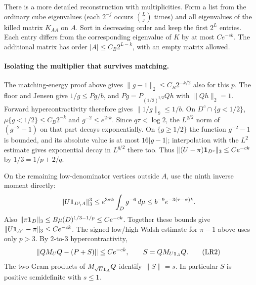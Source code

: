 There is a more detailed reconstruction with multiplicities. Form a list
from the ordinary cube eigenvalues (each $2^{-j}$ occurs $\binom Lj$ times)
and all eigenvalues of the killed matrix $K_{AA}$ on $A$. Sort in decreasing
order and keep the first $2^L$ entries. Each entry differs from the
corresponding eigenvalue of $K$ by at most $Ce^{-ck}$. The additional
matrix has order $|A|\le C_B2^{L-k}$, with an empty matrix allowed.

\paragraph{Isolating the multiplier that survives matching.}
The matching-energy proof above gives $\|g-1\|_2\le C_B2^{-k/2}$
also for this $p$. The floor and Jensen give $1/g\le Pg/b$, and
$Pg=P_{(1/2)^{3/2}}Qh$ with $\|Qh\|_2=1$. Forward hypercontractivity
therefore gives $\|1/g\|_9\le1/b$.
On $D^c\cap\{g<1/2\}$, $\mu\{g<1/2\}\le C_B2^{-k}$ and
$g^{-2}\le e^{2\tau k}$. Since $q\tau<\log 2$,
the $L^{q/2}$ norm of $(g^{-2}-1)$ on that part decays exponentially.
On $\{g\ge1/2\}$ the function $g^{-2}-1$ is bounded, and its absolute
value is at most $16|g-1|$; interpolation with the $L^2$ estimate gives
exponential decay in $L^{q/2}$ there too. Thus
$\|(U-\pi){\bf1}_{D^c}\|_3\le Ce^{-ck}$ by $1/3=1/p+2/q$.

On the remaining low-denominator vertices outside $A$, use the ninth
inverse moment directly:
\[
 \|U{\bf1}_{D\setminus A}\|_3^3
 \le e^{3\sigma k}\int_D g^{-6}\,d\mu
 \le b^{-9}e^{-3(\tau-\sigma)k}.
\]
Also $\|\pi{\bf1}_D\|_3\le B\mu(D)^{1/3-1/p}\le Ce^{-ck}$.
Together these bounds give $\|U{\bf1}_{A^c}-\pi\|_3\le Ce^{-ck}$.
The signed low/high Walsh estimate for $\pi-1$ above uses only $p>3$.
By $2$-to-$3$ hypercontractivity,
\[
 \|QM_UQ-(P+S)\|\le Ce^{-ck},\qquad S=QM_{U{\bf1}_A}Q .       \tag{LR2}
\]
The two Gram products of $M_{\sqrt U{\bf1}_A}Q$ identify $\|S\|=s$.
In particular $S$ is positive semidefinite with $s\le1$.

